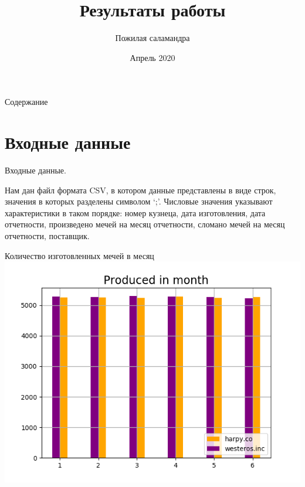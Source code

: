 \documentclass{beamer}
\title[Your Short Title]{Результаты работы}
\author{Пожилая саламандра}
\institute{ВМК МГУ}
\date{Апрель 2020}
\begin{document}
\begin{frame}
  \titlepage
\end{frame}


\begin{frame}{Содержание}
  \tableofcontents
\end{frame}

\section{Входные данные}

\begin{frame}{ Входные данные.}

Нам дан файл формата CSV, в котором данные представлены в виде строк, значения в которых разделены символом ‘;’. Числовые значения указывают характеристики в таком порядке: номер кузнеца, дата изготовления, дата отчетности, произведено мечей на месяц отчетности, сломано мечей на месяц отчетности, поставщик.

\end{frame}
\begin{frame}{Количество изготовленных мечей в месяц}
    \includegraphics[scale = 0.7]{Figure_1.png}
\end{frame}
\end{document}
